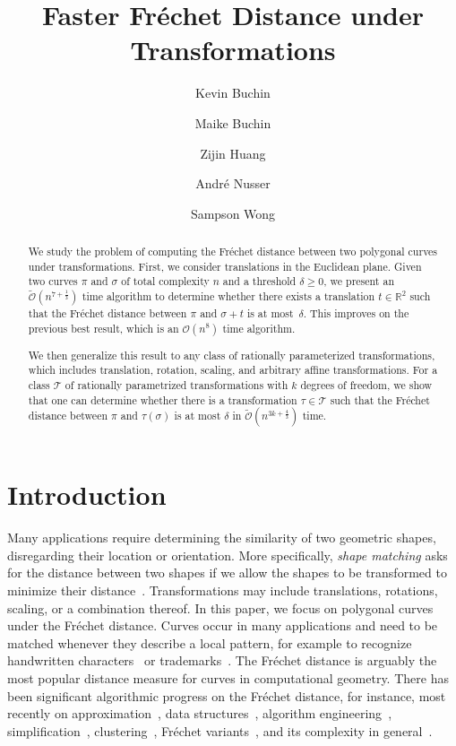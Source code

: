 \documentclass[thm-restate]{lipics-v2021}
\title{Faster Fréchet Distance under Transformations}
\date{}
\author{Kevin Buchin}{Technical University of Dortmund, Germany}{kevin.buchin@tu-dortmund.de}{https://orcid.org/0000-0002-3022-7877}{}
\author{Maike Buchin}{Ruhr University Bochum, Germany}{maike.buchin@rub.de}{https://orcid.org/0000-0002-3446-4343}{}
\author{Zijin Huang}{University of Sydney, Australia}{huang.zi.jin24@gmail.com}{https://orcid.org/0000-0003-3417-5303}{}
\author{André Nusser}{Université Côte d'Azur, CNRS, Inria, France}{andre.nusser@cnrs.fr}{https://orcid.org/0000-0002-6349-869X}{This work was supported by the French government through the France 2030 investment plan managed by the National Research Agency (ANR), as part of the Initiative of Excellence of Université Côte d'Azur under reference number ANR-15-IDEX-01.}
\author{Sampson Wong}{BARC, University of Copenhagen, Denmark}{sawo@di.ku.dk}{https://orcid.org/0000-0003-3803-3804}{}
\theoremstyle{remark}
\begin{document}
\maketitle

\begin{abstract}
    We study the problem of computing the Fréchet distance between two polygonal curves under transformations. First, we consider translations in the Euclidean plane. Given two curves $\pi$ and $\sigma$ of total complexity $n$ and a threshold $\delta \geq 0$, we present an $\tilde{\mathcal{O}}(n^{7 + \frac{1}{3}})$ time algorithm to determine whether there exists a translation $t \in \mathbb{R}^2$ such that the Fréchet distance between $\pi$ and $\sigma + t$ is at most~$\delta$. This improves on the previous best result, which is an $\mathcal{O}(n^8)$ time algorithm.

    We then generalize this result to any class of rationally parameterized transformations, which includes translation, rotation, scaling, and arbitrary affine transformations. For a class $\mathcal T$ of rationally parametrized transformations with $k$ degrees of freedom, we show that one can determine whether there is a transformation $\tau \in \mathcal T$ such that the Fréchet distance between $\pi$ and $\tau(\sigma)$ is at most $\delta$ in $\tilde{\mathcal{O}}(n^{3k+\frac{4}{3}})$ time.
\end{abstract}
    
\section{Introduction}

Many applications require determining the similarity of two geometric shapes, disregarding their location or orientation.
More specifically, \emph{shape matching} asks for the distance between two shapes if we allow the shapes to be transformed to minimize their distance~\cite{Alt09,AltG00,Veltkamp01}.
Transformations may include translations, rotations, scaling, or a combination thereof.
In this paper, we focus on polygonal curves under the Fr\'echet distance.
Curves occur in many applications and need to be matched whenever they describe a local pattern, for example to recognize handwritten characters~\cite{SriraghavendraKB07} or trademarks~\cite{AltSS07}. 
The Fréchet distance is arguably the most popular distance measure for curves in computational geometry.
There has been significant algorithmic progress on the Fr\'echet distance, for instance, most recently on approximation~\cite{ColombeF21,HorstO24,HorstKOS23}, data structures~\cite{AronovFKR24,BringmannDNP22,BuchinBG0W24,BuchinHOSSS22,filtser_static_2023,FiltserFK23,GudmundssonRSW21,GudmundssonSW23},
algorithm engineering~\cite{sigspatial1,sigspatial2,sigspatial3,DBLP:journals/jocg/BringmannKN21,DBLP:conf/esa/BringmannKN20},
simplification~\cite{BringmannC20,ChengH23,KerkhofKLMW19,KreveldLW20}, clustering~\cite{BruningCD22,BuchinDGHKLS19,BuchinDR23,GudmundssonW22,Nath020,DBLP:conf/gis/BuchinDLN19},  Fr\'echet variants~\cite{BuchinFLPRR23,BuchinFSW23,BuchinLOPUV23,DriemelHR22,fan_computing_2021,Filtser0MP23,FoxNPR24}, and its complexity in general~\cite{BlankD24,BuchinOS19,ChengH24,cheng_frechet_nodate}. 
\end{document}
